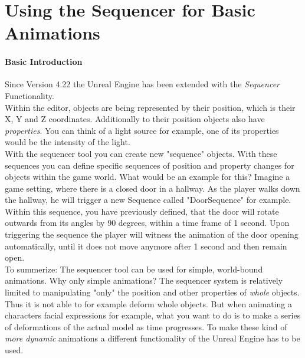 





\section{Using the Sequencer for Basic Animations}

\paragraph{Basic Introduction}

Since Version 4.22 the Unreal Engine has been extended with the \textit{Sequencer} Functionality.\\
Within the editor, objects are being represented by their position, which is their X, Y and Z coordinates. Additionally to their position objects also have \textit{properties}. You can think of a light source for example, one of its properties would be the intensity of the light.\\
With the sequencer tool you can create new "sequence" objects. With these sequences you can define specific sequences of position and property changes for objects within the game world. What would be an example for this? Imagine a game setting, where there is a closed door in a hallway. As the player walks down the hallway, he will trigger a new Sequence called "DoorSequence" for example. Within this sequence, you have previously defined, that the door will rotate outwards from its angles by 90 degrees, within a time frame of 1 second. Upon triggering the sequence the player will witness the animation of the door opening automatically, until it does not move anymore after 1 second and then remain open.\\
To summerize: The sequencer tool can be used for simple, world-bound animations. Why only simple animations? The sequencer system is relatively limited to manipulating "only" the position and other properties of \textit{whole} objects. Thus it is not able to for example deform whole objects. But when animating a characters facial expressions for example, what you want to do is to make a series of deformations of the actual model as time progresses. To make these kind of \textit{more dynamic} animations a different functionality of the Unreal Engine has to be used.

